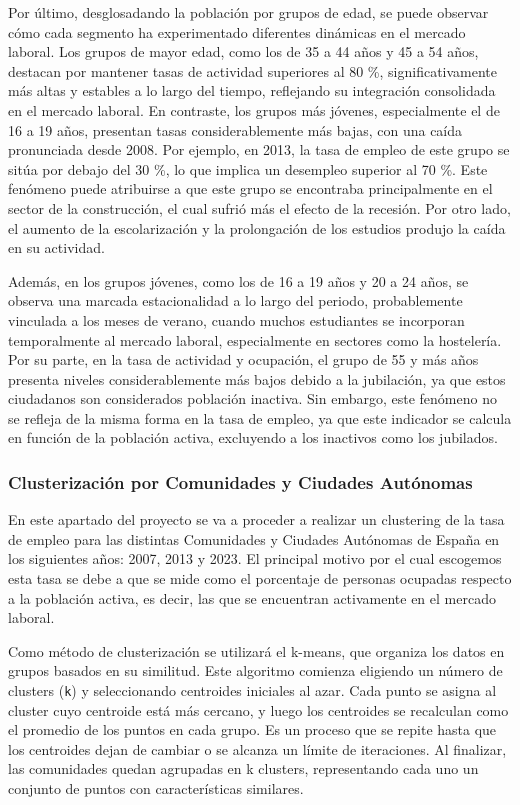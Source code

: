 \documentclass[Universitat de
València,article,submit,moreauthors,pdftex]{Definitions/mdpi}
\begin{document}
Por último, desglosadando la población por grupos de edad, se puede
observar cómo cada segmento ha experimentado diferentes dinámicas en el
mercado laboral. Los grupos de mayor edad, como los de 35 a 44 años y 45
a 54 años, destacan por mantener tasas de actividad superiores al 80 \%,
significativamente más altas y estables a lo largo del tiempo,
reflejando su integración consolidada en el mercado laboral. En
contraste, los grupos más jóvenes, especialmente el de 16 a 19 años,
presentan tasas considerablemente más bajas, con una caída pronunciada
desde 2008. Por ejemplo, en 2013, la tasa de empleo de este grupo se
sitúa por debajo del 30 \%, lo que implica un desempleo superior al 70
\%. Este fenómeno puede atribuirse a que este grupo se encontraba
principalmente en el sector de la construcción, el cual sufrió más el
efecto de la recesión. Por otro lado, el aumento de la escolarización y
la prolongación de los estudios produjo la caída en su actividad.

Además, en los grupos jóvenes, como los de 16 a 19 años y 20 a 24 años,
se observa una marcada estacionalidad a lo largo del periodo,
probablemente vinculada a los meses de verano, cuando muchos estudiantes
se incorporan temporalmente al mercado laboral, especialmente en
sectores como la hostelería. Por su parte, en la tasa de actividad y
ocupación, el grupo de 55 y más años presenta niveles considerablemente
más bajos debido a la jubilación, ya que estos ciudadanos son
considerados población inactiva. Sin embargo, este fenómeno no se
refleja de la misma forma en la tasa de empleo, ya que este indicador se
calcula en función de la población activa, excluyendo a los inactivos
como los jubilados.

\subsubsection{Clusterización por Comunidades y Ciudades
Autónomas}\label{clusterizaciuxf3n-por-comunidades-y-ciudades-autuxf3nomas}

En este apartado del proyecto se va a proceder a realizar un clustering
de la tasa de empleo para las distintas Comunidades y Ciudades Autónomas
de España en los siguientes años: 2007, 2013 y 2023. El principal motivo
por el cual escogemos esta tasa se debe a que se mide como el porcentaje
de personas ocupadas respecto a la población activa, es decir, las que
se encuentran activamente en el mercado laboral.

Como método de clusterización se utilizará el k-means, que organiza los
datos en grupos basados en su similitud. Este algoritmo comienza
eligiendo un número de clusters (\texttt{k}) y seleccionando centroides
iniciales al azar. Cada punto se asigna al cluster cuyo centroide está
más cercano, y luego los centroides se recalculan como el promedio de
los puntos en cada grupo. Es un proceso que se repite hasta que los
centroides dejan de cambiar o se alcanza un límite de iteraciones. Al
finalizar, las comunidades quedan agrupadas en k clusters, representando
cada uno un conjunto de puntos con características similares.
\end{document}
